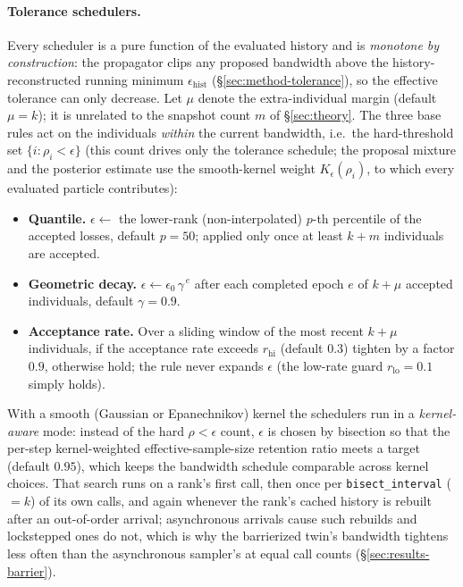 \documentclass[pdflatex,sn-mathphys-num]{sn-jnl}
\theoremstyle{plain}
\theoremstyle{definition}
\begin{document}
\begin{appendices}
\paragraph{Tolerance schedulers.} Every scheduler is a pure function of the evaluated history and is \emph{monotone by construction}: the propagator clips any proposed bandwidth above the history-reconstructed running minimum $\epsilon_{\text{hist}}$ (\S\ref{sec:method-tolerance}), so the effective tolerance can only decrease. Let $\mu$ denote the extra-individual margin (default $\mu=k$); it is unrelated to the snapshot count $m$ of \S\ref{sec:theory}. The three base rules act on the individuals \emph{within} the current bandwidth, i.e.\ the hard-threshold set $\{i:\rho_i<\epsilon\}$ (this count drives only the tolerance schedule; the proposal mixture and the posterior estimate use the smooth-kernel weight $K_\epsilon(\rho_i)$, to which every evaluated particle contributes):
\begin{itemize}
\item \textbf{Quantile.} $\epsilon \leftarrow$ the lower-rank (non-interpolated) $p$-th percentile of the accepted losses, default $p=50$; applied only once at least $k+m$ individuals are accepted.
\item \textbf{Geometric decay.} $\epsilon \leftarrow \epsilon_0\,\gamma^{\,e}$ after each completed epoch $e$ of $k+\mu$ accepted individuals, default $\gamma=0.9$.
\item \textbf{Acceptance rate.} Over a sliding window of the most recent $k+\mu$ individuals, if the acceptance rate exceeds $r_{\text{hi}}$ (default $0.3$) tighten by a factor $0.9$, otherwise hold; the rule never expands $\epsilon$ (the low-rate guard $r_{\text{lo}}=0.1$ simply holds).
\end{itemize}
With a smooth (Gaussian or Epanechnikov) kernel the schedulers run in a \emph{kernel-aware} mode: instead of the hard $\rho<\epsilon$ count, $\epsilon$ is chosen by bisection so that the per-step kernel-weighted effective-sample-size retention ratio meets a target (default $0.95$), which keeps the bandwidth schedule comparable across kernel choices. That search runs on a rank's first call, then once per \texttt{bisect\_interval} ($=k$) of its own calls, and again whenever the rank's cached history is rebuilt after an out-of-order arrival; asynchronous arrivals cause such rebuilds and lockstepped ones do not, which is why the barrierized twin's bandwidth tightens less often than the asynchronous sampler's at equal call counts (\S\ref{sec:results-barrier}).


\end{appendices}
\end{document}
